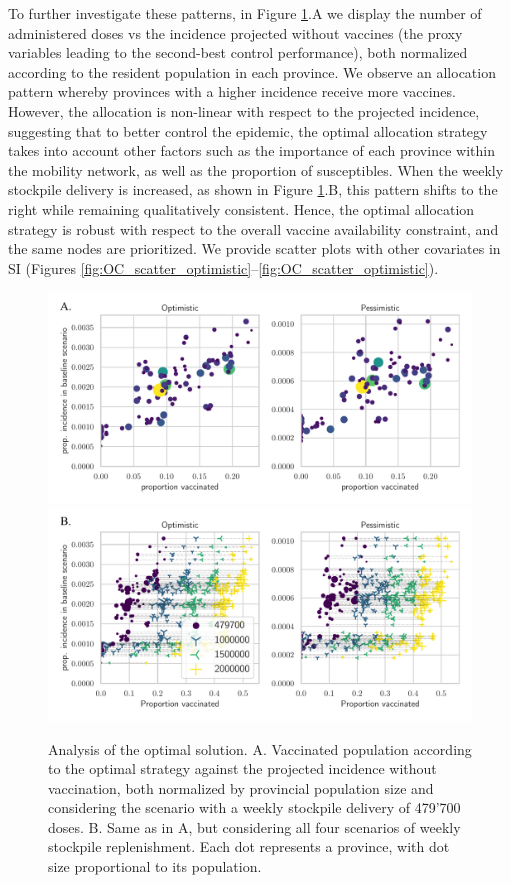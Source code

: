 To further investigate these patterns, in Figure \ref{fig:OC_scatter}.A we display the number of administered doses vs the incidence projected without vaccines (the proxy variables leading to the second-best control performance), both normalized according to the resident population in each province. We observe an allocation pattern whereby provinces with a higher incidence receive more vaccines. However, the allocation is non-linear with respect to the projected incidence, suggesting that to better control the epidemic, the optimal allocation strategy takes into account other factors such as the importance of each province within the mobility network, as well as the proportion of susceptibles. When the weekly stockpile delivery is increased, as shown in Figure \ref{fig:OC_scatter}.B, this pattern shifts to the right while remaining qualitatively consistent. Hence, the optimal allocation strategy is robust with respect to the overall vaccine availability constraint, and the same nodes are prioritized. We provide scatter plots with other covariates in SI (Figures \ref{fig:OC_scatter_optimistic}--\ref{fig:OC_scatter_optimistic}). 

\begin{figure}[!ht]
\centering
\includegraphics{fig_italy-ocp/figures/scatter_top.pdf}
\includegraphics{fig_italy-ocp/figures/scatter_scn.pdf}
\caption[Analysis of the optimal solution]{Analysis of the optimal solution. A. Vaccinated population according to the optimal strategy against the projected incidence without vaccination, both normalized by provincial population size and considering the scenario with a weekly stockpile delivery of 479'700 doses. B. Same as in A, but considering all four scenarios of weekly stockpile replenishment. Each dot represents a province, with dot size proportional to its population.}
    \label{fig:OC_scatter}
\end{figure}

